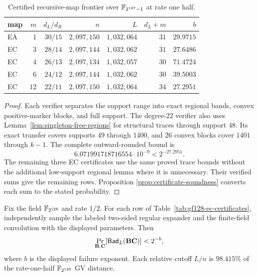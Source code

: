 \begin{table}[ht]
\centering
\caption{Certified recursive-map frontier over $\mathbb F_{2^{127}-1}$ at rate one half.}
\label{tab:p-ec-frontier}
\begin{tabular}{@{}lrrrrrr@{}}
\toprule
map & $m$ & $d_L/d_R$ & $n$ & $L$ & $d_L+m$ & $b$ \\
\midrule
EA & $1$  & $30/15$ & $2{,}097{,}150$ & $1{,}032{,}064$ & $31$ & $29.9715$ \\
EC & $3$  & $28/14$ & $2{,}097{,}144$ & $1{,}032{,}062$ & $31$ & $27.6486$ \\
EC & $4$  & $26/13$ & $2{,}097{,}134$ & $1{,}032{,}057$ & $30$ & $71.4724$ \\
EC & $6$  & $24/12$ & $2{,}097{,}144$ & $1{,}032{,}062$ & $30$ & $39.5003$ \\
EC & $12$ & $22/11$ & $2{,}097{,}150$ & $1{,}032{,}064$ & $34$ & $27.2951$ \\
\bottomrule
\end{tabular}
\end{table}

\begin{proof}
Each verifier separates the support range into exact regional bands, convex
positive-marker blocks, and full support.  The degree-$22$ verifier also uses
Lemma~\ref{lem:singleton-free-regions} for structural traces through support
$48$.  Its exact transfer covers supports $49$ through $1400$, and $26$
convex blocks cover $1401$ through $k-1$.  The complete outward-rounded bound
is
\[
 6.071991718716554\cdot10^{-9}<2^{-27.2951}.
\]
The remaining three EC certificates use the same proved trace bounds without the
additional low-support regional lemma where it is unnecessary.  Their
verified sums give the remaining rows.  Proposition
\ref{prop:certificate-soundness} converts each sum to the stated probability.
\end{proof}

\begin{theorem}
\label{thm:gf128-ec-certificate}
Fix the field $\mathbb F_{2^{128}}$ and rate $1/2$.  For each row of
Table~\ref{tab:gf128-ec-certificates}, independently sample the labeled
two-sided regular expander and the finite-field convolution with the displayed
parameters.  Then
\begin{equation}
 \Pr_{\mathbf B,\mathbf C}[\mathsf{Bad}_L(\mathbf B\mathbf C)]<2^{-b},
 \label{eq:gf128-ec-certificate}
\end{equation}
where $b$ is the displayed failure exponent.  Each relative cutoff $L/n$ is
$98.415\%$ of the rate-one-half $\mathbb F_{2^{128}}$ GV distance.
\end{theorem}

